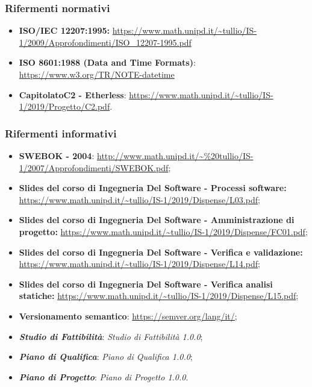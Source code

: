 \subsubsection{Rifermenti normativi}
\begin{itemize}
  \item \textbf{ISO/IEC 12207:1995:} \url{https://www.math.unipd.it/~tullio/IS-1/2009/Approfondimenti/ISO_12207-1995.pdf}
  \item \textbf{ISO 8601:1988 (Data and Time Formats)}: \url {https://www.w3.org/TR/NOTE-datetime} 
  \item \textbf{Capitolato\glo C2 - Etherless}: \url{https://www.math.unipd.it/~tullio/IS-1/2019/Progetto/C2.pdf}.
\end{itemize}

\subsubsection{Rifermenti informativi}
\begin{itemize}
  \item \textbf{SWEBOK - 2004}: \url{http://www.math.unipd.it/~\%20tullio/IS-1/2007/Approfondimenti/SWEBOK.pdf};
  \item \textbf{Slides del corso di Ingegneria Del Software - Processi software:} \url{https://www.math.unipd.it/~tullio/IS-1/2019/Dispense/L03.pdf};
  \item \textbf{Slides del corso di Ingegneria Del Software - Amministrazione di progetto:} \url{https://www.math.unipd.it/~tullio/IS-1/2019/Dispense/FC01.pdf};
  \item \textbf{Slides del corso di Ingegneria Del Software - Verifica e validazione:} \url{https://www.math.unipd.it/~tullio/IS-1/2019/Dispense/L14.pdf};
  \item \textbf{Slides del corso di Ingegneria Del Software - Verifica analisi statiche:} \url{https://www.math.unipd.it/~tullio/IS-1/2019/Dispense/L15.pdf};
  \item \textbf{Versionamento semantico}: \url{https://semver.org/lang/it/;}
  \item \textbf{\textit{Studio di Fattibilità}}: \textit{Studio di Fattibilità 1.0.0\docs};
  \item \textbf{\textit{Piano di Qualifica}}: \textit{Piano di Qualifica 1.0.0\docs};
  \item \textbf{\textit{Piano di Progetto}}: \textit{Piano di Progetto 1.0.0\docs}.

\end{itemize}
